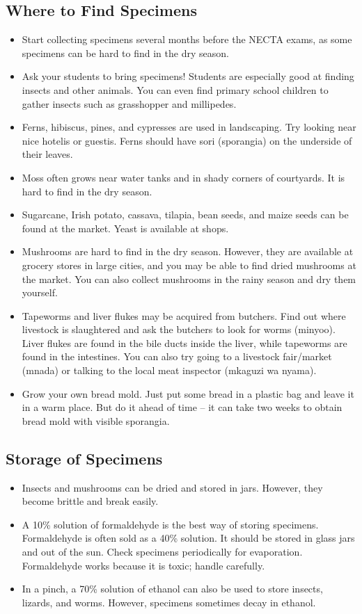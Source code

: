 \subsection{Where to Find Specimens}
\begin{itemize}
\item{Start collecting specimens several months before the NECTA exams, as some specimens can be hard to find in the dry season.}
\item{Ask your students to bring specimens! Students are especially good at finding insects and other animals. You can even find primary school children to gather insects such as grasshopper and millipedes.}
\item{Ferns, hibiscus, pines, and cypresses are used in landscaping. Try looking near nice hotelis or guestis. Ferns should have sori (sporangia) on the underside of their leaves.}
\item{Moss often grows near water tanks and in shady corners of courtyards. It is hard to find in the dry season.}
\item{Sugarcane, Irish potato, cassava, tilapia, bean seeds, and maize seeds can be found at the market. Yeast is available at shops.}
\item{Mushrooms are hard to find in the dry season. However, they are available at grocery stores in large cities, and you may be able to find dried mushrooms at the market. You can also collect mushrooms in the rainy season and dry them yourself.}
\item{Tapeworms and liver flukes may be acquired from butchers. Find out where livestock is slaughtered and ask the butchers to look for worms (minyoo). Liver flukes are found in the bile ducts inside the liver, while tapeworms are found in the intestines. You can also try going to a livestock fair/market (mnada) or talking to the local meat inspector (mkaguzi wa nyama).}
\item{Grow your own bread mold. Just put some bread in a plastic bag and leave it in a warm place. But do it ahead of time -- it can take two weeks to obtain bread mold with visible sporangia.}
\end{itemize}

\subsection{Storage of Specimens}
\begin{itemize}
\item{Insects and mushrooms can be dried and stored in jars. However, they become brittle and break easily.}
\item{A 10\% solution of formaldehyde is the best way of storing specimens. Formaldehyde is often sold as a 40\% solution. It should be stored in glass jars and out of the sun. Check specimens periodically for evaporation. Formaldehyde works because it is toxic; handle carefully.}
\item{In a pinch, a 70\% solution of ethanol can also be used to store insects, lizards, and worms. However, specimens sometimes decay in ethanol.}
­­\end{itemize}


